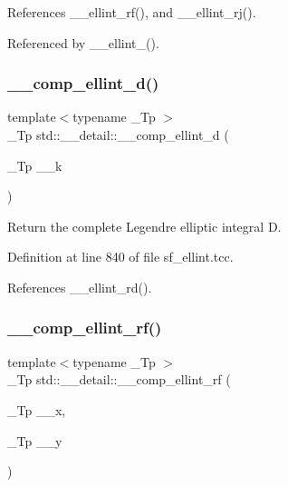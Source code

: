 References \+\_\+\+\_\+ellint\+\_\+rf(), and \+\_\+\+\_\+ellint\+\_\+rj().



Referenced by \+\_\+\+\_\+ellint\+\_().

\mbox{\label{namespacestd_1_1____detail_add5220a1ab03915e4a45dc547bb8eef6}} 
\subsubsection{\texorpdfstring{\+\_\+\+\_\+comp\+\_\+ellint\+\_\+d()}{\_\_comp\_ellint\_d()}}
{\footnotesize\ttfamily template$<$typename \+\_\+\+Tp $>$ \\
\+\_\+\+Tp std\+::\+\_\+\+\_\+detail\+::\+\_\+\+\_\+comp\+\_\+ellint\+\_\+d (\begin{DoxyParamCaption}\item[{\+\_\+\+Tp}]{\+\_\+\+\_\+k }\end{DoxyParamCaption})}

Return the complete Legendre elliptic integral D. 

Definition at line 840 of file sf\+\_\+ellint.\+tcc.



References \+\_\+\+\_\+ellint\+\_\+rd().

\mbox{\label{namespacestd_1_1____detail_a41ecec8820344d3575b464ecd4db5171}} 
\subsubsection{\texorpdfstring{\+\_\+\+\_\+comp\+\_\+ellint\+\_\+rf()}{\_\_comp\_ellint\_rf()}}
{\footnotesize\ttfamily template$<$typename \+\_\+\+Tp $>$ \\
\+\_\+\+Tp std\+::\+\_\+\+\_\+detail\+::\+\_\+\+\_\+comp\+\_\+ellint\+\_\+rf (\begin{DoxyParamCaption}\item[{\+\_\+\+Tp}]{\+\_\+\+\_\+x,  }\item[{\+\_\+\+Tp}]{\+\_\+\+\_\+y }\end{DoxyParamCaption})}



